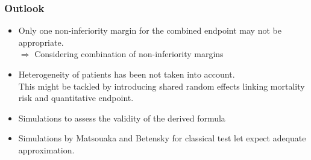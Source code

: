 \documentclass[xcolor=pdftex,dvipsnames,table]{beamer}\usepackage[]{graphicx}\usepackage[]{color}
\begin{document}
\begin{frame} %
\frametitle{Outlook}
\begin{itemize}
\item Only one non-inferiority margin for the combined endpoint may not be appropriate. \\
$\Rightarrow$  Considering combination of non-inferiority margins \item Heterogeneity of patients has been not taken into account. \\
      This might be tackled by introducing shared random effects linking mortality risk and quantitative endpoint.
\item Simulations to assess the validity of the derived formula
\item Simulations by Matsouaka and Betensky for classical test let expect adequate approximation.
\end{itemize}
\end{frame}
\end{document}
